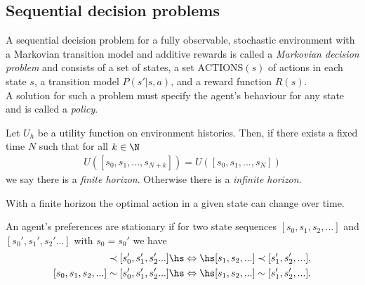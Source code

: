 \documentclass{article}
\begin{document}
\subsection{Sequential decision problems}

\begin{definition}
    A sequential decision problem for a fully observable, stochastic environment
    with a Markovian transition model and additive rewards is called a \emph{Markovian
    decision problem} and consists of a set of states, a set $\text{ACTIONS}(s)$ of
    actions in each state $s$, a transition model $P(s'|s,a)$, and a reward function
    $R(s)$.\\
    A solution for such a problem must specify the agent's behaviour for any state
    and is called a \emph{policy}.
\end{definition}

\begin{definition}
    Let $U_h$ be a utility function on environment histories. Then, if there exists
    a fixed time $N$ such that for all $k\in\N$
    \begin{align*}
        U([s_0,s_1,...,s_{N+k}]) = U([s_0,s_1,...,s_N]) 
    \end{align*}
    we say there is a \emph{finite horizon}. Otherwise there is a \emph{infinite
    horizon}.
\end{definition}

\begin{theorem}
    With a finite horizon the optimal action in a given state can change over time.
\end{theorem}

\begin{definition}
    An agent's preferences are stationary if for two state sequences
    $[s_0, s_1, s_2, ...]$ and $[s_0', s_1', s_2'...]$ with $s_0=s_0'$ we have
    \begin{align*}
        [s_0, s_1, s_2, ...] \prec [s_0', s_1', s_2'...]\hs&\Leftrightarrow\hs
        [s_1, s_2, ...] \prec [s_1', s_2', ...],\\
        [s_0, s_1, s_2, ...] \sim [s_0', s_1', s_2'...]\hs&\Leftrightarrow\hs
        [s_1, s_2, ...] \sim [s_1', s_2', ...].
    \end{align*}
\end{definition}
\end{document}
